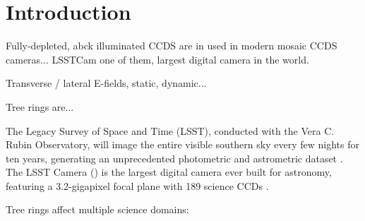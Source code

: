 \section{Introduction} \label{sec:intro}

Fully-depleted, abck illuminated CCDS are in used in modern mosaic CCDS cameras...  LSSTCam one of them, largest digital camera in the world. 

Transverse / lateral E-fields, static, dynamic... 

Tree rings are... 

The Legacy Survey of Space and Time (LSST), conducted with the Vera C. Rubin Observatory, will image the entire visible southern sky every few nights for ten years, generating an unprecedented photometric and astrometric dataset \citep{Ivezic2019}. The LSST Camera (\lsstcam) is the largest digital camera ever built for astronomy, featuring a 3.2-gigapixel focal plane with 189 science CCDs \citep{Roodman2023}.

Tree rings affect multiple science domains:

